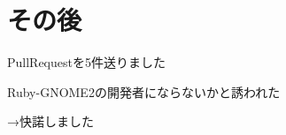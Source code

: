 \section{その後}

\begin{frame}
\begin{itemize}
{\Large
\item PullRequestを5件送りました
\item Ruby-GNOME2の開発者にならないかと誘われた
}
\end{itemize}
{\Huge
→快諾しました
}
\end{frame}
